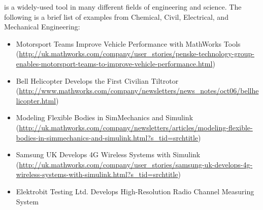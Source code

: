 \mlab is a widely-used tool in many different fields of engineering and science. The following is a brief list of examples from Chemical, Civil, Electrical, and Mechanical Engineering:
\begin{itemize}
\item Motorsport Teams Improve Vehicle Performance with MathWorks Tools\\
(\href{http://uk.mathworks.com/company/user_stories/penske-technology-group-enables-motorsport-teams-to-improve-vehicle-performance.html}{http://uk.mathworks.com/company/user\_stories/penske-technology-group-enables-motorsport-teams-to-improve-vehicle-performance.html})
\item Bell Helicopter Develops the First Civilian Tiltrotor\\
(\href{http://www.mathworks.com/company/newsletters/news_notes/oct06/bellhelicopter.html}{http://www.mathworks.com/company/newsletters/news\_notes/oct06/bellhelicopter.html})
\item Modeling Flexible Bodies in SimMechanics and Simulink\\
(\href{http://uk.mathworks.com/company/newsletters/articles/modeling-flexible-bodies-in-simmechanics-and-simulink.html?s_tid=srchtitle}{http://uk.mathworks.com/company/newsletters/articles/modeling-flexible-bodies-in-simmechanics-and-simulink.html?s\_tid=srchtitle})
\item Samsung UK Develops 4G Wireless Systems with Simulink\\
(\href{http://uk.mathworks.com/company/user_stories/samsung-uk-develops-4g-wireless-systems-with-simulink.html?s_tid=srchtitle}{http://uk.mathworks.com/company/user\_stories/samsung-uk-develops-4g-wireless-systems-with-simulink.html?s\_tid=srchtitle})
\item Elektrobit Testing Ltd. Develops High-Resolution Radio Channel Measuring System\\

\end{itemize}
